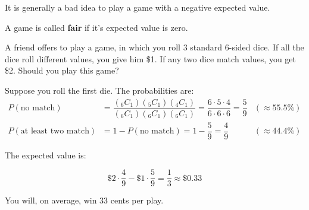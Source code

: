 \documentclass{beamer}
\newcommand{\prob}[1]{P\left(#1\right)}
\newcommand{\comb}[2]{_{#1}C_{#2}}
\begin{document}
\begin{frame}
\begin{note}
It is generally a bad idea to play a game with a negative expected value.

\vspace{2mm}
A game is called \textbf{fair} if it's expected value is zero.
\end{note}\pause

\begin{example}
A friend offers to play a game, in which you roll 3 standard 6-sided dice. If all the dice roll different values, you give him \$1. If any two dice match values, you get \$2. Should you play this game?\pause

\vspace{2mm}
Suppose you roll the first die. The probabilities are:
\begin{equation*}
\begin{aligned}
\prob{\text{no match}} &= \dfrac{\left(\comb{6}{1}\right)\left(\comb{5}{1}\right)\left(\comb{4}{1}\right)}{\left(\comb{6}{1}\right)\left(\comb{6}{1}\right)\left(\comb{6}{1}\right)} = \dfrac{6\cdot5\cdot4}{6\cdot6\cdot6} = \dfrac{5}{9} &\left(\approx 55.5\%\right) \\
\prob{\text{at least two match}} &= 1 - \prob{\text{no match}} = 1-\dfrac{5}{9} = \dfrac{4}{9} &\left(\approx 44.4\%\right)
\end{aligned}
\end{equation*}\pause

\vspace{-5mm}
The expected value is:

\vspace{-5mm}
\begin{equation*}
\$2\cdot\dfrac{4}{9} -\$1\cdot\dfrac{5}{9} = \dfrac{1}{3} \approx \$0.33
\end{equation*}

\vspace{-1mm}
You will, on average, win 33 cents per play.
\end{example}
\end{frame}
\end{document}

